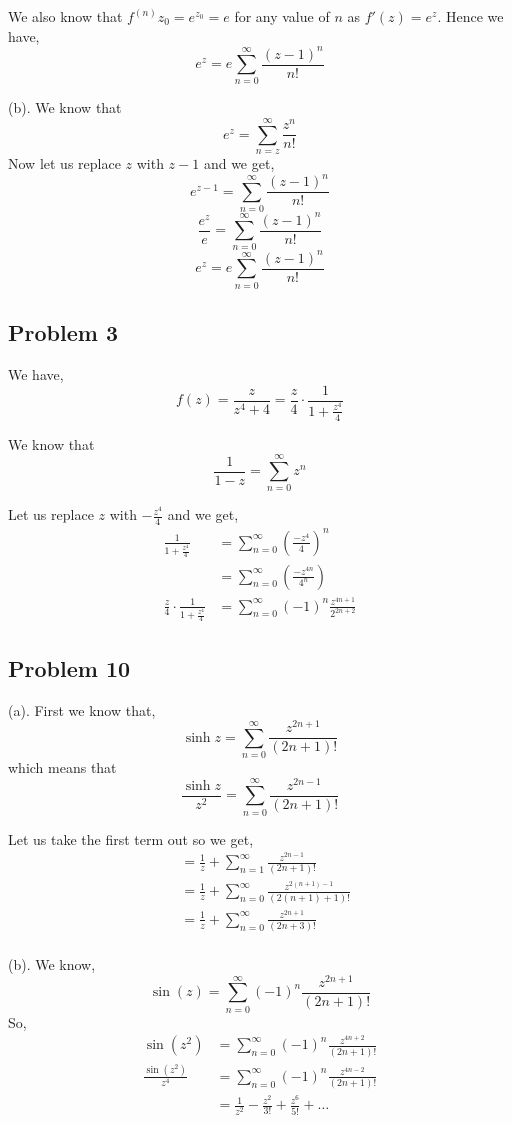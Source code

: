 \documentclass[a4paper]{report}
\begin{document}
We also know that $f^{(n)}z_0 = e^{z_0} = e$  for any value of $n$ as $f'(z) = e^{z}$. Hence we have, 
$$ e^{z} = e \sum_{n=0}^{\infty} \frac{(z-1)^{n}}{n!} $$ 

(b). We know that $$e^{z} = \sum_{n=z}^{\infty} \frac{z^{n}}{n!}$$ Now let us replace $z$ with $z - 1$ and we get, 
$$ e^{z - 1} = \sum_{n=0}^{\infty} \frac{(z-1)^{n}}{n!} $$ 
$$ \frac{e^{z}}{e} =  \sum_{n=0}^{\infty} \frac{(z-1)^{n}}{n!} $$ 
$$ e^{z} = e \sum_{n=0}^{\infty} \frac{(z-1)^{n}}{n!} $$ 

\subsection*{Problem 3}
We have, 
$$ f(z) = \frac{z}{z^{4} + 4} = \frac{z}{4} \cdot \frac{1}{1 + \frac{z^{4}}{4}} $$ 

We know that $$\frac{1}{1 - z} = \sum_{n=0}^{\infty} z^{n}$$

Let us replace $z $ with $-\frac{z^{4}}{4}$ and we get, 
\begin{align*}
    \frac{1}{1 + \frac{z^{4}}{4}} &= \sum_{n=0}^{\infty} (\frac{-z^{4}}{4})^{n}\\
                                  &= \sum_{n=0}^{\infty} (\frac{-z^{4n}}{4^{n}})\\
    \frac{z}{4} \cdot \frac{1}{1 + \frac{z^{4}}{4}} &= \sum_{n=0}^{\infty} (-1)^{n} \frac{z^{4n + 1}}{2^{2n + 2}}
\end{align*}



\subsection*{Problem 10}
(a). First we know that, 
$$ \sinh z = \sum_{n=0}^{\infty} \frac{z^{2n + 1}}{(2n+1)!} $$  which means that
$$ \frac{\sinh z}{z^2} = \sum_{n=0}^{\infty} \frac{z^{2n - 1}}{(2n+1)!} $$ 

Let us take the first term out so we get, 
\begin{align*}
     &= \frac{1}{z} + \sum_{n=1}^{\infty} \frac{z^{2n - 1}}{(2n+1)!}\\
     &= \frac{1}{z} + \sum_{n=0}^{\infty} \frac{z^{2(n + 1) - 1}}{(2(n + 1) + 1 )!}\\
     &= \frac{1}{z} + \sum_{n=0}^{\infty} \frac{z^{2n + 1}}{(2n +3 )!}\\
\end{align*}

(b). We know, 
$$\sin(z) = \sum_{n=0}^{\infty} (-1)^{n} \frac{z^{2n + 1}}{(2n+1)!}$$
So, 
\begin{align*}
    \sin(z^2) &= \sum_{n=0}^{\infty} (-1)^{n} \frac{z^{4n + 2}}{(2n+1)!}\\
    \frac{\sin(z^2)}{z^{4}} &= \sum_{n=0}^{\infty} (-1)^{n} \frac{z^{4n - 2}}{(2n+1)!}\\
                            &= \frac{1}{z^2} - \frac{z^2}{3!} + \frac{z^{6}}{5!} + \dots
\end{align*}
\end{document}
